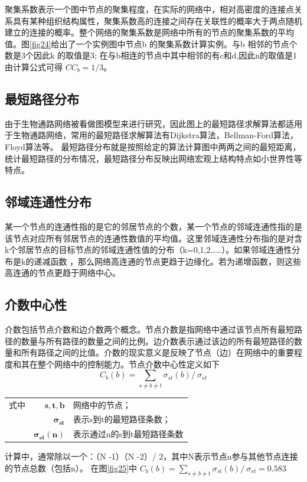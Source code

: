 聚集系数表示一个图中节点的聚集程度，在实际的网络中，相对高密度的连接点关系具有某种组织结构属性，聚集系数高的连接之间存在关联性的概率大于两点随机建立的连接的概率。整个网络的聚集系数是网络中所有的节点的聚集系数的平均值。图\ref{fig24}给出了一个实例图中节点b 的聚集系数计算实例。与b 相邻的节点个数是3个因此k 的取值是3; 在与b相连的节点中其中相邻的有c和d,因此n的取值是1由计算公式可得 $CC_{b}=1/3$。


\subsection{最短路径分布}
由于生物通路网络被看做图模型来进行研究，因此图上的最短路径求解算法都适用于生物通路网络，常用的最短路径求解算法有Dijkstra\cite{deng2012fuzzy}算法，Bellman-Ford\cite{goldberg1993heuristic}算法，Floyd\cite{floyd1962algorithm}算法等。
最短路径分布就是按照给定的算法计算图中两两之间的最短距离，统计最短路径的分布情况，最短路径分布反映出网络宏观上结构特点如小世界性等特点\cite{assenov2007computing}。

\subsection{邻域连通性分布}
某一个节点的连通性指的是它的邻居节点的个数，某一个节点的邻域连通性指的是该节点对应所有邻居节点的连通性数值的平均值。这里邻域连通性分布指的是对含k个邻居节点的目标节点的邻域连通性值的分布（k=0,1,2……）。如果邻域连通性分布是k的递减函数 ，那么网络高连通的节点更趋于边缘化。若为递增函数，则这些高连通的节点更趋于网络中心。
\subsection{介数中心性}
介数包括节点介数和边介数两个概念。节点介数是指网络中通过该节点所有最短路径的数量与所有路径的数量之间的比例。边介数表示通过该边的所有最短路径的数量和所有路径之间的比值。介数的现实意义是反映了节点（边）在网络中的重要程度和其在整个网络中的控制能力。节点介数中心性定义如下
\begin{equation}\label{eq26}
	C_{b}( b) =\sum\limits _{s\neq b\neq t} \sigma_{st}( b) /\ \sigma_{st}
\end{equation}

\begin{tabularx}{\textwidth}{@{}l@{\quad}r@{———}X@{}}
式中 & $\boldsymbol{s,t,b}$ &  网络中的节点；\\
	& $\boldsymbol{ \sigma_{st}}$ &   表示s到t的最短路径条数；\\
	& $\boldsymbol{\sigma_{st}( n)}$ &	表示通过n的s到t最短路径条数 \\
\end{tabularx}\vspace{3.15bp}
计算中，通常除以一个：（N -1）（N -2）/ 2，其中N表示节点n参与其他节点连接的节点总数（包括n）。
在图\ref{fig25}中 $C_{b}( b) =\sum\limits _{s\neq b\neq t} \sigma_{st}( b) /\ \sigma_{st} =  0.583$

